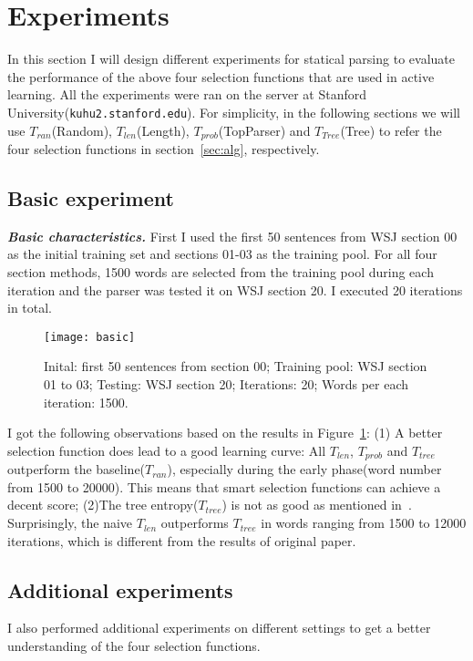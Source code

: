 \documentclass[10pt]{article}
\begin{document}
\section{Experiments}\label{sec:exp}
In this section I will design different experiments for statical parsing to evaluate the performance of the above four selection functions that are used in active learning. 
All the experiments were ran on the server at Stanford University(\texttt{kuhu2.stanford.edu}). For simplicity, in the following sections we will use $T_{ran}$(Random), $T_{len}$(Length), $T_{prob}$(TopParser) and 
$T_{Tree}$(Tree) to refer the four selection functions in section~\ref{sec:alg}, respectively.


\subsection{Basic experiment}
{\bf \emph{Basic characteristics.}} First I used the first 50 sentences from WSJ 
section 00 as the initial training set and sections 01-03 as the training pool.
For all four section methods, 1500 words are selected from the training pool during 
each iteration and the parser was tested it on WSJ section 20. I executed 20 iterations in total.

 \begin{figure}
\centering
\texttt{[image: basic]}
\caption{Inital: first 50 sentences from section 00; Training pool: WSJ section 01 to 03; Testing: WSJ section 20; Iterations: 20; Words per each iteration: 1500.}\label{fig:basic}
\end{figure}

I got the following observations based on the results in Figure~\ref{fig:basic}: (1) 
A better selection function does lead to a good learning curve: All $T_{len}$, 
$T_{prob}$ and $T_{tree}$ outperform the baseline($T_{ran}$), especially during the early phase(word number from 1500 to 20000). This means that smart selection functions can achieve a decent 
score; (2)The tree entropy($T_{tree}$) is not as good as mentioned in~\cite{hwa}. 
Surprisingly, the naive $T_{len}$ outperforms $T_{tree}$ in words ranging from 1500
to 12000 iterations, which is different from the results of original paper. 


\subsection{Additional experiments}
I also performed additional experiments on different settings to get a better understanding of the four selection functions.
\end{document}
